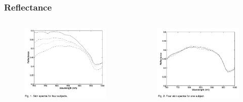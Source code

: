 \documentclass{beamer}
\begin{document}
\begin{frame}
\frametitle{Reflectance}
\begin{columns}
\begin{column}{0.5\textwidth}
\begin{figure}
\includegraphics[width=\textwidth]{4subjects}
\end{figure}
\end{column}
\begin{column}{0.5\textwidth}
\begin{figure}
\includegraphics[width=\textwidth]{1subject}
\end{figure}
\end{column}
\end{columns}
\end{frame}
\end{document}
